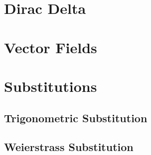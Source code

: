 \section{Dirac Delta}


\section{Vector Fields}


\section{Substitutions}
\subsection{Trigonometric Substitution}
\subsection{Weierstrass Substitution}


